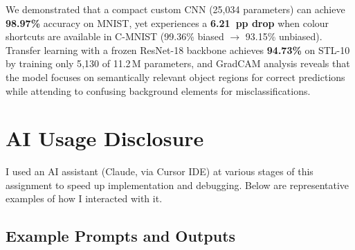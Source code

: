 \documentclass[11pt,a4paper]{article}
\begin{document}
We demonstrated that a compact custom CNN (25{,}034 parameters) can achieve
\textbf{98.97\%} accuracy on MNIST, yet experiences a \textbf{6.21~pp drop}
when colour shortcuts are available in C-MNIST (99.36\% biased $\to$ 93.15\%
unbiased). Transfer learning with a frozen ResNet-18 backbone achieves
\textbf{94.73\%} on STL-10 by training only 5{,}130 of 11.2\,M parameters,
and GradCAM analysis reveals that the model focuses on semantically relevant
object regions for correct predictions while attending to confusing background
elements for misclassifications.

\section{AI Usage Disclosure}

I used an AI assistant (Claude, via Cursor IDE) at various stages of this
assignment to speed up implementation and debugging. Below are representative
examples of how I interacted with it.

\subsection*{Example Prompts and Outputs}
\end{document}
